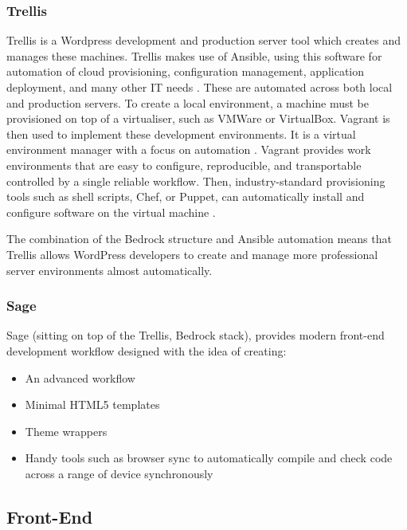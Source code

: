\documentclass[fontsize=11pt]{extarticle}
\numberwithin{figure}{section} %
\numberwithin{table}{section}%
\providecommand{\tightlist}{%
  \setlength{\itemsep}{0pt}\setlength{\parskip}{0pt}}
\begin{document}
\hypertarget{trellis}{%
\subsubsection{Trellis}\label{trellis}}

Trellis is a Wordpress development and production server tool which
creates and manages these machines. Trellis makes use of Ansible, using
this software for automation of cloud provisioning, configuration
management, application deployment, and many other IT needs \cite{p12}.
These are automated across both local and production servers. To create
a local environment, a machine must be provisioned on top of a
virtualiser, such as VMWare or VirtualBox. Vagrant is then used to
implement these development environments. It is a virtual environment
manager with a focus on automation \cite{p10}. Vagrant provides work
environments that are easy to configure, reproducible, and transportable
controlled by a single reliable workflow. Then, industry-standard
provisioning tools such as shell scripts, Chef, or Puppet, can
automatically install and configure software on the virtual machine
\cite{p10}.

The combination of the Bedrock structure and Ansible automation means
that Trellis allows WordPress developers to create and manage more
professional server environments almost automatically.

\hypertarget{sage}{%
\subsubsection{Sage}\label{sage}}

Sage (sitting on top of the Trellis, Bedrock stack), provides modern
front-end development workflow designed with the idea of creating:

\begin{itemize}
\tightlist
\item
  An advanced workflow
\item
  Minimal HTML5 templates
\item
  Theme wrappers
\item
  Handy tools such as browser sync to automatically compile and check
  code across a range of device synchronously
\end{itemize}

\hypertarget{front-end}{%
\subsection{Front-End}\label{front-end}}
\end{document}
